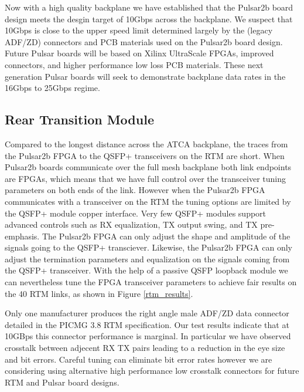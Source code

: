 \documentclass[letterpaper]{article}
\begin{document}
Now with a high quality backplane we have established that the Pulsar2b board design meets the desgin target of 10Gbps across the backplane.  We suspect that 10Gbps is close to the upper speed limit determined largely by the (legacy ADF/ZD) connectors and PCB materials used on the Pulsar2b board design.  Future Pulsar boards will be based on Xilinx UltraScale FPGAs, improved connectors, and higher performance low loss PCB materials.  These next generation Pulsar boards will seek to demonstrate backplane data rates in the 16Gbps to 25Gbps regime.

\subsection{Rear Transition Module}
\label{link_perf_rtm}

Compared to the longest distance across the ATCA backplane, the traces from the Pulsar2b FPGA to the QSFP+ transceivers on the RTM are short.  When Pulsar2b boards communicate over the full mesh backplane both link endpoints are FPGAs, which means that we have full control over the transceiver tuning parameters on both ends of the link.  However when the Pulsar2b FPGA communicates with a transceiver on the RTM the tuning options are limited by the QSFP+ module copper interface.  Very few QSFP+ modules support advanced controls such as RX equalization, TX output swing, and TX pre-emphasis.  The Pulsar2b FPGA can only adjust the shape and amplitude of the signals going to the QSFP+ transciever.  Likewise, the Pulsar2b FPGA can only adjust the termination parameters and equalization on the signals coming from the QSFP+ transceiver.  With the help of a passive QSFP loopback module we can nevertheless tune the FPGA transceiver parameters to achieve fair results on the 40 RTM links, as shown in Figure \ref{rtm_results}.

Only one manufacturer produces the right angle male ADF/ZD data connector detailed in the PICMG 3.8 RTM specification.  Our test results indicate that at 10GBps this connector performance is marginal.  In particular we have observed crosstalk between adjecent RX TX pairs leading to a reduction in the eye size and bit errors.  Careful tuning can eliminate bit error rates however we are considering using alternative high performance low crosstalk connectors for future RTM and Pulsar board designs.
\end{document}
